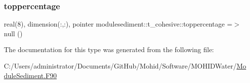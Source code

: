 \mbox{\label{structmodulesediment_1_1t__cohesive_a83a66c3fb9055f974736f99240a621f0}} 
\subsubsection{\texorpdfstring{toppercentage}{toppercentage}}
{\footnotesize\ttfamily real(8), dimension(\+:,\+:), pointer modulesediment\+::t\+\_\+cohesive\+::toppercentage =$>$ null ()\hspace{0.3cm}{\ttfamily [private]}}



The documentation for this type was generated from the following file\+:\begin{DoxyCompactItemize}
\item 
C\+:/\+Users/administrator/\+Documents/\+Git\+Hub/\+Mohid/\+Software/\+M\+O\+H\+I\+D\+Water/\mbox{\hyperlink{_module_sediment_8_f90}{Module\+Sediment.\+F90}}\end{DoxyCompactItemize}
